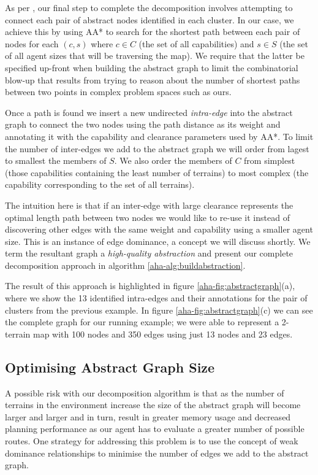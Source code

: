 {As per \cite{botea04}, our final step to complete the decomposition involves attempting to connect each pair of abstract nodes identified in each cluster. 
In our case, we achieve this by using AA* to search for the shortest path between each pair of nodes for each $(c, s)$ where $c \in C$ (the set of all capabilities) and $s \in S$ (the set of all agent sizes that will be traversing the map). We require that the latter be specified up-front when building the abstract graph to limit the combinatorial blow-up that results from trying to reason about the number of shortest paths between two points in complex problem spaces such as ours.
\par \indent
Once a path is found we insert a new undirected \emph{intra-edge} into the abstract graph to connect the two nodes using the path distance as its weight and annotating it with the capability and clearance parameters used by AA*. 
To limit the number of inter-edges we add to the abstract graph we will order from lagest to smallest the members of $S$. 
We also order the members of $C$ from simplest (those capabilities containing the least number of terrains) to most complex (the capability corresponding to the set of all terrains). 
\par \indent
The intuition here is that if an inter-edge with large clearance represents the optimal length path between two nodes we would like to re-use it instead of discovering other edges with the same weight and capability using a smaller agent size. This is an instance of edge dominance, a concept we will discuss shortly.
We term the resultant graph a \emph{high-quality abstraction} and present our complete decomposition approach in  algorithm \ref{aha-alg:buildabstraction}.
\par \indent
The result of this approach is highlighted in figure \ref{aha-fig:abstractgraph}(a), where we show the 13 identified intra-edges and their annotations for the pair of clusters from the previous example. In figure \ref{aha-fig:abstractgraph}(c) we can see the complete graph for our running example; we were able to represent a 2-terrain map with 100 nodes and 350 edges using just 13 nodes and  23 edges. 



\subsection{Optimising Abstract Graph Size}
A possible risk with our decomposition algorithm is that as the number of terrains in the environment increase the size of the abstract graph will become larger and larger and in turn, result in greater memory usage and decreased planning performance as our agent has to evaluate a greater number of possible routes.
One strategy for addressing this problem is to use the concept of weak dominance relationships to minimise the number of edges we add to the abstract graph. 

}

